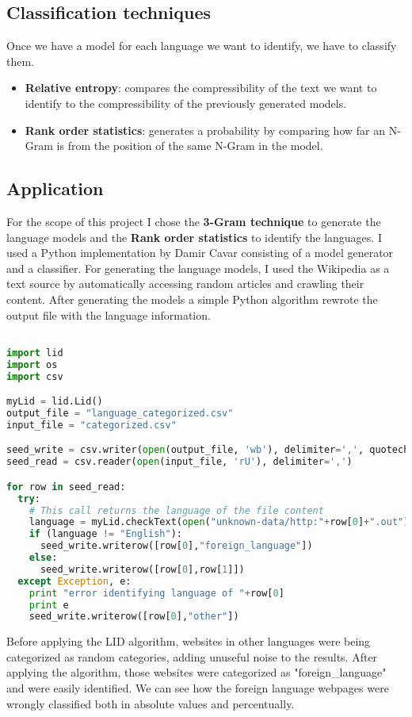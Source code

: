 \subsection{Classification techniques}
Once we have a model for each language we want to identify, we have to classify them.
\begin{itemize}
  \item {\bf Relative entropy}: compares the compressibility of the text we want to identify to the compressibility of the previously generated models.
  \item {\bf Rank order statistics}: generates a probability by comparing how far an N-Gram is from the position of the same N-Gram in the model.
\end{itemize}
\subsection{Application}
For the scope of this project I chose the {\bf 3-Gram technique} to generate the language models and the {\bf Rank order statistics} to identify the languages. I used a Python implementation by Damir Cavar\cite{lid1} consisting of a model generator and a classifier.
For generating the language models, I used the Wikipedia as a text source by automatically accessing random articles and crawling their content. After generating the models a simple Python algorithm rewrote the output file with the language information.

\begin{lstlisting}[language=Python]

import lid
import os
import csv

myLid = lid.Lid()
output_file = "language_categorized.csv"
input_file = "categorized.csv"

seed_write = csv.writer(open(output_file, 'wb'), delimiter=',', quotechar='|', quoting=csv.QUOTE_MINIMAL)
seed_read = csv.reader(open(input_file, 'rU'), delimiter=',')

for row in seed_read:
  try:
    # This call returns the language of the file content
    language = myLid.checkText(open("unknown-data/http:"+row[0]+".out").read())
    if (language != "English"):
      seed_write.writerow([row[0],"foreign_language"])
    else:
      seed_write.writerow([row[0],row[1]])
  except Exception, e:
    print "error identifying language of "+row[0]
    print e
    seed_write.writerow([row[0],"other"])
\end{lstlisting}

Before applying the LID algorithm, websites in other languages were being categorized as random categories, adding unuseful noise to the results. After applying the algorithm, those websites were categorized as "foreign\_language" and were easily identified. We can see how the foreign language webpages were wrongly classified both in absolute values and percentually.


 
